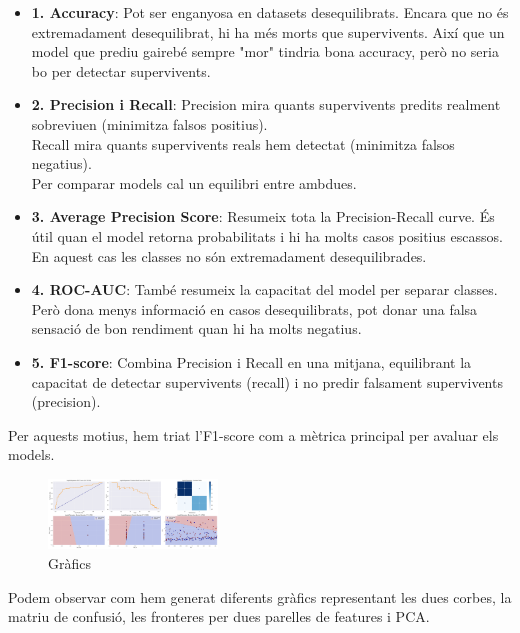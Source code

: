 \documentclass[9pt,a4paper,twoside]{tau-class/tau}
\begin{document}
\begin{itemize}

\item \textbf{1. Accuracy}: Pot ser enganyosa en datasets desequilibrats.
   Encara que no és extremadament desequilibrat, hi ha més morts que supervivents.
   Així que un model que prediu gairebé sempre "mor" tindria bona accuracy, però no seria bo per detectar supervivents.

\item \textbf{2. Precision i Recall}: Precision mira quants  supervivents predits realment sobreviuen (minimitza falsos positius).
\\ Recall mira quants  supervivents reals hem detectat (minimitza falsos negatius).
\\Per comparar models cal un equilibri entre ambdues.

\item \textbf{3. Average Precision Score}: Resumeix tota la Precision-Recall curve.
   És útil quan el model retorna probabilitats i hi ha molts casos positius escassos.
   En aquest cas les classes no són extremadament desequilibrades.

\item \textbf{4. ROC-AUC}: També resumeix la capacitat del model per separar classes.
   Però dona menys informació en casos desequilibrats, pot donar una falsa sensació de bon rendiment quan hi ha molts negatius.

\item \textbf{5. F1-score}: Combina Precision i Recall en una mitjana, equilibrant la capacitat de detectar supervivents (recall) i no predir falsament supervivents (precision).

\end{itemize}

Per aquests motius, hem triat l'F1-score com a mètrica principal per avaluar els models.

\begin{figure}[H]
    \centering
    \includegraphics[width=0.4\textwidth]{figures/punt3.png}
    \caption{Gràfics}
    \label{fig:exemple}
\end{figure}

Podem observar com hem generat diferents gràfics representant les dues corbes, la matriu de confusió, les fronteres per dues parelles de features i PCA.
\end{document}
